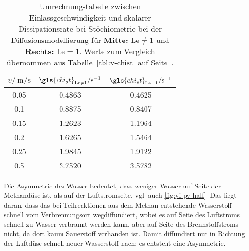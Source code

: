 \begin{table}[h]
    \begin{center}\begin{scriptsize}\begin{tabular}{|c|c|c|}
        \hline
        $v / \SI{}{\meter\per\second}$ &
        $\gls{chi_st}_{\mathrm{Le}\neq 1} / \SI{}{\per\second}$ &
        $\gls{chi_st}_{\mathrm{Le}= 1} / \SI{}{\per\second}$
        \\
        \hline
        0.05  & 0.4863 & 0.4625 \\
        0.1   & 0.8875 & 0.8407 \\
        0.15  & 1.2623 & 1.1964 \\
        0.2   & 1.6265 & 1.5464 \\
        0.25  & 1.9845 & 1.9122 \\
        0.5   & 3.7520 & 3.5782 \\
        \hline
    \end{tabular}\end{scriptsize}\end{center}
    \caption{
        Umrechnungstabelle zwischen Einlassgeschwindigkeit und skalarer Dissipationsrate bei Stöchiometrie bei der Diffusionsmodellierung für
        \textbf{Mitte:} $\mathrm{Le}\neq 1$ und
        \textbf{Rechts:} $\mathrm{Le}=1$.
        Werte zum Vergleich übernommen aus Tabelle~\ref{tbl:v-chist} auf Seite~\pageref{tbl:v-chist}.
    }
    \label{tbl:opplevar:v-chist}
\end{table}

Die Asymmetrie des Wasser bedeutet, dass weniger Wasser auf Seite der Methandüse ist, als auf der Luftstromseite, vgl. auch \autoref{fig:yi-pv-half}. Das liegt daran, dass das bei Teilreaktionen aus dem Methan entstehende Wasserstoff schnell vom Verbrennungsort wegdiffundiert, wobei es auf Seite des Luftstroms schnell zu Wasser verbrannt werden kann, aber auf Seite des Brennstoffstroms nicht, da dort kaum Sauerstoff vorhanden ist. Damit diffundiert nur in Richtung der Luftdüse schnell neuer Wasserstoff nach; es entsteht eine Asymmetrie.

